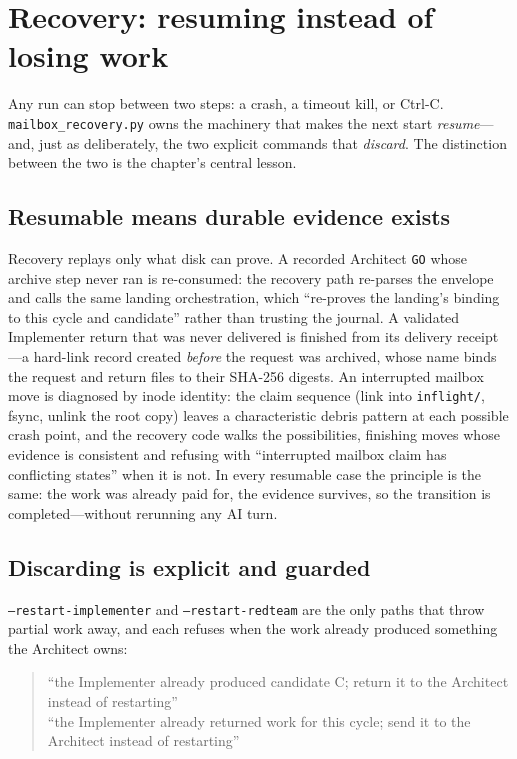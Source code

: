 \documentclass[10pt,aps,prd,twocolumn,nofootinbib]{revtex4-2}
\newcommand{\code}[1]{\texttt{#1}}
\newcommand{\file}[1]{\texttt{#1}}
\begin{document}
\section{Recovery: resuming instead of losing work}
\label{sec:recovery}

Any run can stop between two steps: a crash, a timeout kill, or
Ctrl-C.  \file{mailbox\_recovery.py} owns the machinery that makes the
next start \emph{resume}---and, just as deliberately, the two explicit
commands that \emph{discard}.  The distinction between the two is the
chapter's central lesson.

\subsection{Resumable means durable evidence exists}

Recovery replays only what disk can prove.  A recorded Architect
\code{GO} whose archive step never ran is re-consumed: the recovery
path re-parses the envelope and calls the same landing orchestration,
which ``re-proves the landing's binding to this cycle and candidate''
rather than trusting the journal.  A validated Implementer return that
was never delivered is finished from its delivery receipt---a
hard-link record created \emph{before} the request was archived, whose
name binds the request and return files to their SHA-256 digests.  An
interrupted mailbox move is diagnosed by inode identity: the claim
sequence (link into \file{inflight/}, fsync, unlink the root copy)
leaves a characteristic debris pattern at each possible crash point,
and the recovery code walks the possibilities, finishing moves whose
evidence is consistent and refusing with ``interrupted mailbox claim
has conflicting states'' when it is not.  In every resumable case the
principle is the same: the work was already paid for, the evidence
survives, so the transition is completed---without rerunning any AI
turn.

\subsection{Discarding is explicit and guarded}

\code{--restart-implementer} and \code{--restart-redteam} are the only
paths that throw partial work away, and each refuses when the work
already produced something the Architect owns:

\begin{quote}\small
``the Implementer already produced candidate C; return it to the
Architect instead of restarting''\\
``the Implementer already returned work for this cycle; send it to
the Architect instead of restarting''
\end{quote}
\end{document}
